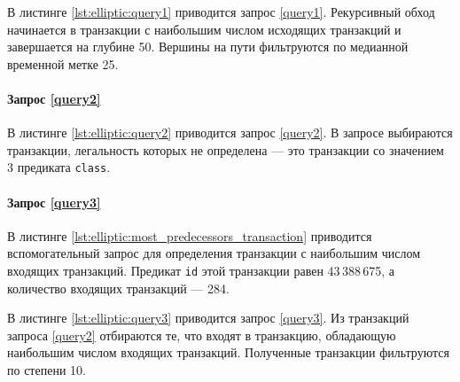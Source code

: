 В листинге \ref{lst:elliptic:query1} приводится запрос \ref{query1}. Рекурсивный обход начинается в транзакции с
наибольшим числом исходящих транзакций и завершается на глубине 50. Вершины на пути фильтруются по медианной временной
метке 25.

\paragraph{Запрос \ref{query2}}

В листинге \ref{lst:elliptic:query2} приводится запрос \ref{query2}. В запросе выбираются транзакции,
легальность которых не определена --- это транзакции со значением 3 предиката \texttt{class}. %

\paragraph{Запрос \ref{query3}}

В листинге \ref{lst:elliptic:most_predecessors_transaction} приводится вспомогательный запрос для определения
транзакции с наибольшим числом входящих транзакций. Предикат \texttt{id} этой транзакции равен 43\,388\,675, а
количество входящих транзакций --- 284.

В листинге \ref{lst:elliptic:query3} приводится запрос \ref{query3}. Из транзакций запроса \ref{query2} отбираются те,
что входят в транзакцию, обладающую наибольшим числом входящих транзакций. Полученные транзакции фильтруются по степени 10.

